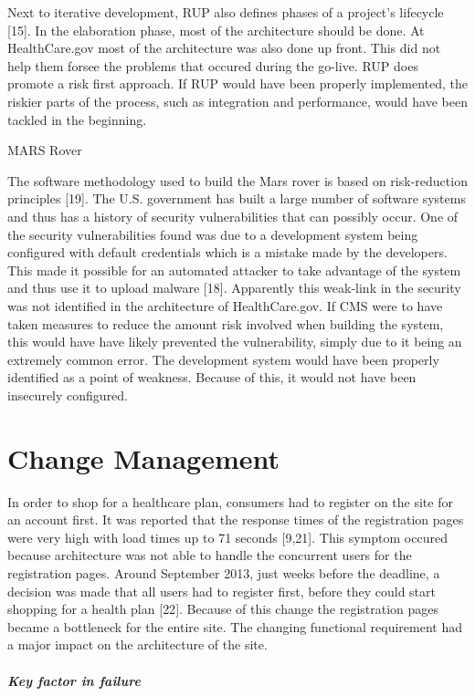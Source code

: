 \documentclass[]{article}
\let\oldsubparagraph\subparagraph
\renewcommand{\subparagraph}[1]{\oldsubparagraph{#1}\mbox{}}
\begin{document}
Next to iterative development, RUP also defines phases of a project's
lifecycle {[}15{]}. In the elaboration phase, most of the architecture
should be done. At HealthCare.gov most of the architecture was also done
up front. This did not help them forsee the problems that occured during
the go-live. RUP does promote a risk first approach. If RUP would have
been properly implemented, the riskier parts of the process, such as
integration and performance, would have been tackled in the beginning.

MARS Rover

The software methodology used to build the Mars rover is based on
risk-reduction principles {[}19{]}. The U.S. government has built a
large number of software systems and thus has a history of security
vulnerabilities that can possibly occur. One of the security
vulnerabilities found was due to a development system being configured
with default credentials which is a mistake made by the developers. This
made it possible for an automated attacker to take advantage of the
system and thus use it to upload malware {[}18{]}. Apparently this
weak-link in the security was not identified in the architecture of
HealthCare.gov. If CMS were to have taken measures to reduce the amount
risk involved when building the system, this would have have likely
prevented the vulnerability, simply due to it being an extremely common
error. The development system would have been properly identified as a
point of weakness. Because of this, it would not have been insecurely
configured.

\section{Change Management}\label{change-management}

In order to shop for a healthcare plan, consumers had to register on the
site for an account first. It was reported that the response times of
the registration pages were very high with load times up to 71 seconds
{[}9,21{]}. This symptom occured because architecture was not able to
handle the concurrent users for the registration pages. Around September
2013, just weeks before the deadline, a decision was made that all users
had to register first, before they could start shopping for a health
plan {[}22{]}. Because of this change the registration pages became a
bottleneck for the entire site. The changing functional requirement had
a major impact on the architecture of the site.

\subparagraph{Key factor in failure}\label{key-factor-in-failure}
\end{document}
